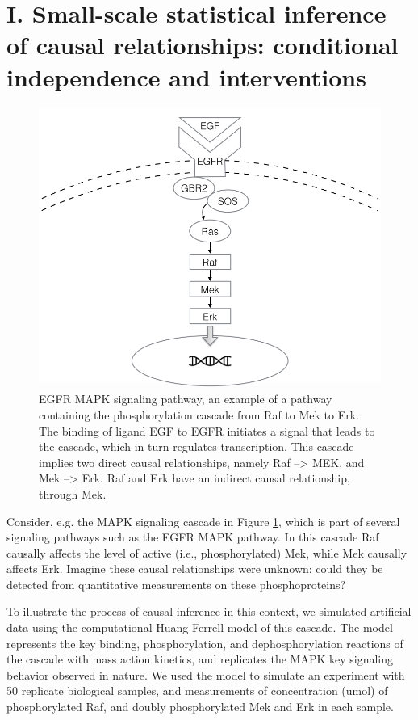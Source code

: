 \documentclass[journal=jacsat,manuscript=article]{achemso}
\begin{document}
\section{I. Small-scale statistical inference of causal relationships: conditional independence and interventions}

\begin{figure}[!tpb]
\centerline{\includegraphics[width=.5\textwidth]{figs/egfr.png}}
\caption{EGFR MAPK signaling pathway, an example of a pathway containing the phosphorylation cascade from Raf to Mek to Erk.  The binding of ligand EGF to EGFR initiates a signal that leads to the cascade, which in turn regulates transcription.  This cascade implies two direct causal relationships, namely Raf --> MEK, and Mek --> Erk.  Raf and Erk have an indirect causal relationship, through Mek.\label{mapk}}
\end{figure}

Consider, e.g. the MAPK signaling cascade in Figure \ref{mapk}, which is part of several signaling pathways such as the EGFR MAPK pathway\cite{holbro2004erbb}. In this cascade Raf causally affects the level of active (i.e., phosphorylated) Mek, while Mek causally affects Erk. Imagine these causal relationships were unknown: could they be detected from quantitative measurements on these phosphoproteins?  

To illustrate the process of causal inference in this context, we simulated artificial data using the computational Huang-Ferrell model \cite{huang1996ultrasensitivity} of this cascade. The model represents the key binding, phosphorylation, and dephosphorylation reactions of the cascade with mass action kinetics, and replicates the MAPK key signaling behavior observed in nature.  We used the model to simulate an experiment with 50 replicate biological samples, and measurements of concentration (umol) of phosphorylated Raf, and doubly phosphorylated Mek and Erk in each sample. 
\end{document}
